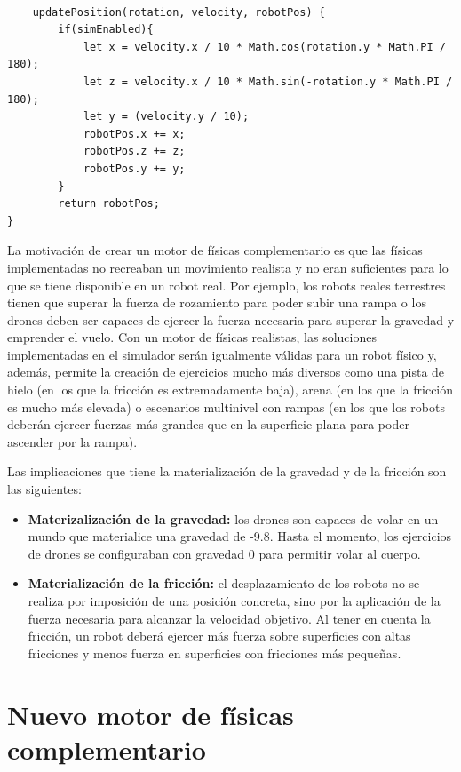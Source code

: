 \small{
\begin{verbatim} 

    updatePosition(rotation, velocity, robotPos) {
        if(simEnabled){
            let x = velocity.x / 10 * Math.cos(rotation.y * Math.PI / 180);
            let z = velocity.x / 10 * Math.sin(-rotation.y * Math.PI / 180);
            let y = (velocity.y / 10);
            robotPos.x += x;
            robotPos.z += z;
            robotPos.y += y;
        }
        return robotPos;
}
\end{verbatim}
}

\normalsize
La motivación de crear un motor de físicas complementario es que las físicas implementadas no recreaban un movimiento realista y no eran suficientes para lo que se tiene disponible en un robot real. Por ejemplo, los robots reales terrestres tienen que superar la fuerza de rozamiento para poder subir una rampa o los drones deben ser capaces de ejercer la fuerza necesaria para superar la gravedad y emprender el vuelo. Con un motor de físicas realistas, las soluciones implementadas en el simulador serán igualmente válidas para un robot físico y, además, permite la creación de ejercicios mucho más diversos como una pista de hielo (en los que la fricción es extremadamente baja), arena (en los que la fricción es mucho más elevada) o escenarios multinivel con rampas (en los que los robots deberán ejercer fuerzas más grandes que en la superficie plana para poder ascender por la rampa). \newline

Las implicaciones que tiene la materialización de la gravedad y de la fricción son las siguientes:

\begin{itemize}
    \item \textbf{Materizalización de la gravedad:} los drones son capaces de volar en un mundo que materialice una gravedad de -9.8. Hasta el momento, los ejercicios de drones se configuraban con gravedad 0 para permitir volar al cuerpo.
    \item \textbf{Materialización de la fricción:} el desplazamiento de los robots no se realiza por imposición de una posición concreta, sino por la aplicación de la fuerza necesaria para alcanzar la velocidad objetivo. Al tener en cuenta la fricción, un robot deberá ejercer más fuerza sobre superficies con altas fricciones y menos fuerza en superficies con fricciones más pequeñas.
\end{itemize}

\section{Nuevo motor de físicas complementario}
